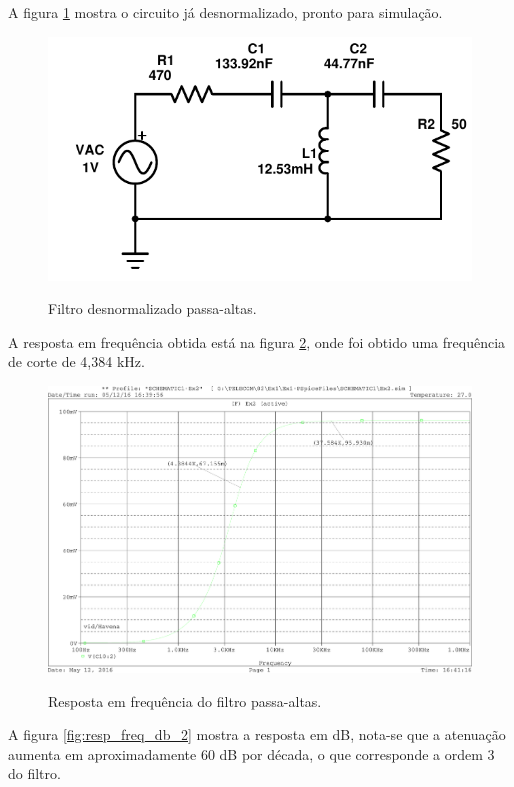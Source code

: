 A figura \ref{fig:fpa} mostra o circuito já desnormalizado, pronto para 
simulação.

\begin{figure}[!h]
  \centering
  
  \includegraphics[scale=0.4]{Imagens/fpa}
  \label{fig:fpa}
  \caption{Filtro desnormalizado passa-altas.}
\end{figure}

A resposta em frequência obtida está na figura \ref{fig:resp_freq_2}, onde foi 
obtido uma frequência de corte de 4,384 kHz. 

\begin{figure}[!h]
  \centering
  
  \includegraphics[scale=0.3]{Imagens/resp_freq_2}
  \label{fig:resp_freq_2}
  \caption{Resposta em frequência do filtro passa-altas.}
\end{figure}

A figura \ref{fig:resp_freq_db_2} mostra a resposta em dB, nota-se que a 
atenuação aumenta em aproximadamente 60 dB por década, o que corresponde a 
ordem 3 do filtro.

